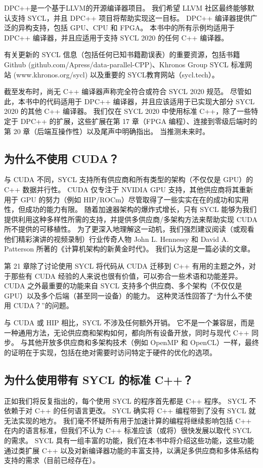 DPC++是一个基于LLVM的开源编译器项目。 我们希望 LLVM 社区最终能够默认支持 SYCL，并且 DPC++ 项目将帮助实现这一目标。 DPC++ 编译器提供广泛的异构支持，包括 GPU、CPU 和 FPGA。 本书中的所有示例均适用于 DPC++ 编译器，并且应适用于支持 SYCL 2020 的任何 C++ 编译器。

\begin{remark}
	有关更新的 SYCL 信息（包括任何已知书籍勘误表）的重要资源，包括书籍 Github (github.com/Apress/data-parallel-CPP)、Khronos Group SYCL 标准网站 (www.khronos.org/sycl) 以及重要的 SYCL教育网站（sycl.tech）。
\end{remark}

截至发布时，尚无 C++ 编译器声称完全符合或符合 SYCL 2020 规范。 尽管如此，本书中的代码适用于 DPC++ 编译器，并且应该适用于已实现大部分 SYCL 2020 的其他 C++ 编译器。 我们仅在 SYCL 2020 中使用标准 C++，除了一些特定于 DPC++ 的扩展，这些扩展在第 17 章（FPGA 编程）、连接到零级后端时的第 20 章（后端互操作性）以及尾声中明确指出。 当推测未来时。

\subsection{为什么不使用 CUDA？}
与 CUDA 不同，SYCL 支持所有供应商和所有类型的架构（不仅仅是 GPU）的 C++ 数据并行性。 CUDA 仅专注于 NVIDIA GPU 支持，其他供应商将其重新用于 GPU 的努力（例如 HIP/ROCm）尽管取得了一些实实在在的成功和实用性，但成功的能力有限。 随着加速器架构的爆炸式增长，只有 SYCL 能够为我们提供利用这种多样性所需的支持，并提供多供应商/多架构方法来帮助实现 CUDA 所不提供的可移植性。 为了更深入地理解这一动机，我们强烈建议阅读（或观看他们精彩演讲的视频录制）行业传奇人物 John L. Hennessy 和 David A. Patterson 所著的《计算机架构的新黄金时代》。 我们认为这是一篇必读的文章。

第 21 章除了讨论使用 SYCL 将代码从 CUDA 迁移到 C++ 有用的主题之外，对于那些有 CUDA 经验的人来说也很有价值，可以弥合一些术语和功能差异。 CUDA 之外最重要的功能来自 SYCL 支持多个供应商、多个架构（不仅仅是 GPU）以及多个后端（甚至同一设备）的能力。 这种灵活性回答了“为什么不使用 CUDA？”的问题。

与 CUDA 或 HIP 相比，SYCL 不涉及任何额外开销。 它不是一个兼容层，而是一种通用方法，无论供应商和架构如何，都向所有设备开放，同时与现代 C++ 同步。 与其他开放多供应商和多架构技术（例如 OpenMP 和 OpenCL）一样，最终的证明在于实现，包括在绝对需要时访问特定于硬件的优化的选项。

\subsection{为什么使用带有 SYCL 的标准 C++？}
正如我们将反复指出的，每个使用 SYCL 的程序首先都是 C++ 程序。 SYCL 不依赖于对 C++ 的任何语言更改。 SYCL 确实将 C++ 编程带到了没有 SYCL 就无法实现的地方。 我们毫不怀疑所有用于加速计算的编程将继续影响包括 C++ 在内的语言标准，但我们不认为 C++ 标准应该（或将）很快发展以取代 SYCL 的需求。 SYCL 具有一组丰富的功能，我们在本书中将介绍这些功能，这些功能通过类扩展 C++ 以及对新编译器功能的丰富支持，以满足多供应商和多体系结构支持的需求（目前已经存在）。

